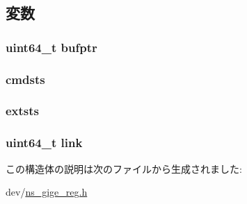 \subsection{変数}
\hypertarget{structns__desc64_a4cc37142919fe863bc2b5959baba2b4f}{
\subsubsection[{bufptr}]{\setlength{\rightskip}{0pt plus 5cm}uint64\_\-t {\bf bufptr}}}
\label{structns__desc64_a4cc37142919fe863bc2b5959baba2b4f}
\hypertarget{structns__desc64_a7484a3aa644dde4355c24a2c6365715d}{
\subsubsection[{cmdsts}]{ {\bf cmdsts}}}
\label{structns__desc64_a7484a3aa644dde4355c24a2c6365715d}
\hypertarget{structns__desc64_ad874b18768bd13482acfbe2b4825996a}{
\subsubsection[{extsts}]{ {\bf extsts}}}
\label{structns__desc64_ad874b18768bd13482acfbe2b4825996a}
\hypertarget{structns__desc64_a4aaf43c9fa9d5efdd466a4ab4a50de75}{
\subsubsection[{link}]{\setlength{\rightskip}{0pt plus 5cm}uint64\_\-t {\bf link}}}
\label{structns__desc64_a4aaf43c9fa9d5efdd466a4ab4a50de75}


この構造体の説明は次のファイルから生成されました:\begin{DoxyCompactItemize}
\item 
dev/\hyperlink{ns__gige__reg_8h}{ns\_\-gige\_\-reg.h}\end{DoxyCompactItemize}
